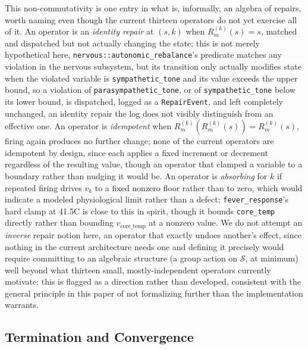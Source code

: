 \documentclass[11pt]{article}
\begin{document}
This non-commutativity is one entry in what is, informally, an algebra of repairs, worth naming even though the current thirteen operators do not yet exercise all of it. An operator is an \emph{identity repair} at $(s, k)$ when $R_m^{(k)}(s) = s$, matched and dispatched but not actually changing the state; this is not merely hypothetical here, \texttt{nervous::autonomic\_rebalance}'s predicate matches any violation in the nervous subsystem, but its transition only actually modifies state when the violated variable is \texttt{sympathetic\_tone} and its value exceeds the upper bound, so a violation of \texttt{parasympathetic\_tone}, or of \texttt{sympathetic\_tone} below its lower bound, is dispatched, logged as a \texttt{RepairEvent}, and left completely unchanged, an identity repair the log does not visibly distinguish from an effective one. An operator is \emph{idempotent} when $R_m^{(k)}(R_m^{(k)}(s)) = R_m^{(k)}(s)$, firing again produces no further change; none of the current operators are idempotent by design, since each applies a fixed increment or decrement regardless of the resulting value, though an operator that clamped a variable to a boundary rather than nudging it would be. An operator is \emph{absorbing} for $k$ if repeated firing drives $v_k$ to a fixed nonzero floor rather than to zero, which would indicate a modeled physiological limit rather than a defect; \texttt{fever\_response}'s hard clamp at 41.5\textdegree C is close to this in spirit, though it bounds \texttt{core\_temp} directly rather than bounding $v_{\text{core\_temp}}$ at a nonzero value. We do not attempt an \emph{inverse} repair notion here, an operator that exactly undoes another's effect, since nothing in the current architecture needs one and defining it precisely would require committing to an algebraic structure (a group action on $\mathcal S$, at minimum) well beyond what thirteen small, mostly-independent operators currently motivate; this is flagged as a direction rather than developed, consistent with the general principle in this paper of not formalizing further than the implementation warrants.

\subsection{Termination and Convergence}
\end{document}
